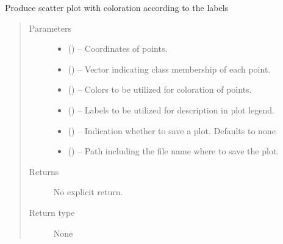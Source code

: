 \documentclass[letterpaper,10pt,english]{sphinxmanual}
\begin{document}
\begin{fulllineitems}
\label{\detokenize{api/ucf.scatter_plot_with_groups:ucf.scatter_plot_with_groups}}
Produce scatter plot with coloration according to the labels
\begin{quote}\begin{description}
\item[{Parameters}] \leavevmode\begin{itemize}
\item {} 
 () -- Coordinates of points.

\item {} 
 () -- Vector indicating class membership of each point.

\item {} 
 () -- Colors to be utilized for coloration of points.

\item {} 
 () -- Labels to be utilized for description in plot legend.

\item {} 
 () -- Indication whether to save a plot. Defaults to none

\item {} 
 () -- Path including the file name where to save the plot.

\end{itemize}

\item[{Returns}] \leavevmode
No explicit return.

\item[{Return type}] \leavevmode
None

\end{description}\end{quote}

\end{fulllineitems}
\end{document}
